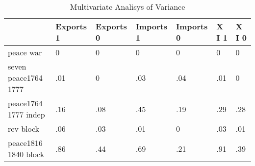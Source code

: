 \begin{table}[htbp]
\caption{\label{manova_test} Multivariate Analisys of Variance}\centering\medskip
\begin{tabular}{|l|l|l|l|l|l|l|}\hline  
 & Exports 1  & Exports 0  & Imports 1  & Imports 0  & X I 1  & X I 0  \\ \hline  
peace war & 0 & 0 & 0 & 0 & 0 & 0 \\ \hline 
seven peace1764 1777 & .01 & 0 & .03 & .04 & .01 & 0 \\ \hline 
peace1764 1777 indep & .16 & .08 & .45 & .19 & .29 & .28 \\ \hline 
rev block & .06 & .03 & .01 & 0 & .03 & .01 \\ \hline 
peace1816 1840 block & .86 & .44 & .69 & .21 & .91 & .39 \\ \hline 
  \end{tabular}
\end{table}
